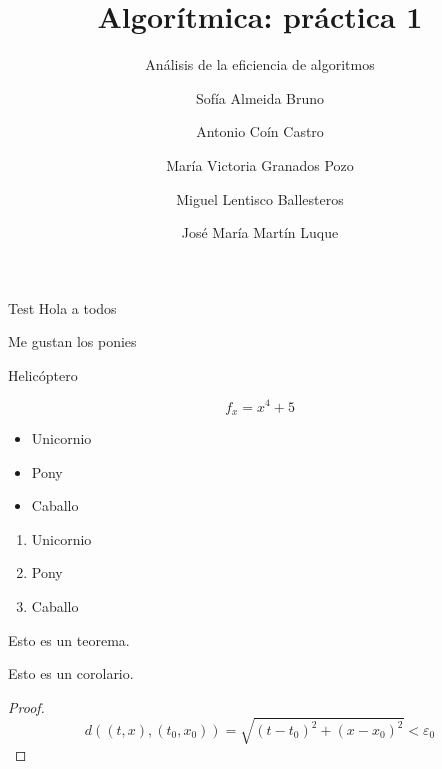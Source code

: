 \documentclass[spanish]{beamer}
\title{Algorítmica: práctica 1}
\subtitle{Análisis de la eficiencia de algoritmos}
\author{Sofía Almeida Bruno \and Antonio Coín Castro \and María Victoria Granados Pozo \and Miguel Lentisco Ballesteros \and José María Martín Luque}
\begin{document}


\maketitle

\begin{frame}{Test}
	Hola a todos
	
	Me gustan los ponies
	
	Helicóptero
	
	$$ f_x = x^4+5$$
\end{frame}

\begin{frame}
	\begin{itemize}
		\item Unicornio
		\item Pony
		\item Caballo
	\end{itemize}
\end{frame}

\begin{frame}
	\begin{enumerate}
		\item Unicornio
		\item Pony
		\item Caballo
	\end{enumerate}
\end{frame}

\begin{frame}
	\begin{theorem}
		Esto es un teorema.
	\end{theorem}
	\begin{corollary}
		Esto es un corolario.
	\end{corollary}
	\begin{proof}
		$$d((t, x), (t_0, x_0)) = \sqrt{(t-t_0)^2 + (x-x_0)^2} < \varepsilon_0$$
	\end{proof}
\end{frame}

\begin{frame}
	\begin{center}
		
	\end{center}
	
\end{frame}
\end{document}
